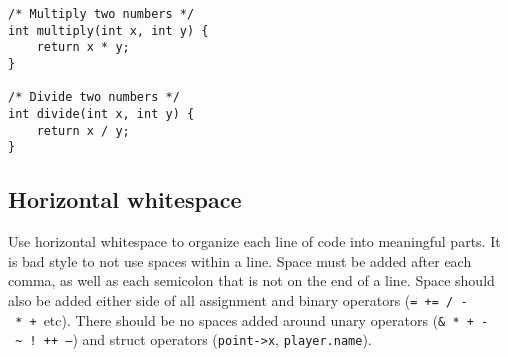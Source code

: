 \documentclass{article}
\newcommand{\propertilde}{\nolinkurl{~}}
\begin{document}
\begin{lstlisting}
/* Multiply two numbers */
int multiply(int x, int y) {
    return x * y;
}

/* Divide two numbers */
int divide(int x, int y) {
    return x / y;
}
\end{lstlisting}

\subsection{Horizontal whitespace}
Use horizontal whitespace to organize each line of code into meaningful parts.
It is bad style to not use spaces within a line.
Space must be added after each comma, as well as each semicolon that is not on the end of a line.
Space should also be added either side of all assignment and binary operators (\texttt{=~+=~/~-~*~+}~etc).
There should be no spaces added around unary operators (\texttt{\&~*~+~-~\propertilde~!~++~--}) and struct operators (\texttt{point->x}, \texttt{player.name}).
\end{document}
